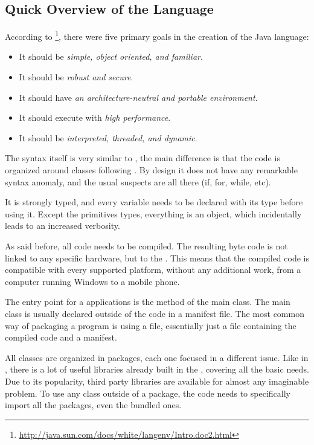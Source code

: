 
\subsection{Quick Overview of the Language} %
\label{sub:overviewjava}

According to \footnote{\url{http://java.sun.com/docs/white/langenv/Intro.doc2.html}}, there were five primary goals in the creation of the Java language:

\begin{itemize}
  \item It should be \emph{simple, object oriented, and familiar}.
  \item It should be \emph{robust and secure}.
  \item It should have \emph{an architecture-neutral and portable environment}.
  \item It should execute with \emph{high performance}.
  \item It should be \emph{interpreted, threaded, and dynamic}.
\end{itemize}

The syntax itself is very similar to , the main difference is that the code is organized around classes following .
By design it does not have any remarkable syntax anomaly, and the usual suspects are all there (if, for, while, etc).

It is strongly typed, and every variable needs to be declared with its type before using it.
Except the primitives types, everything is an object, which incidentally leads to an increased verbosity.

As said before, all code needs to be compiled.
The resulting byte code is not linked to any specific hardware, but to the .
This means that the compiled code is compatible with every supported platform, without any additional work, from a computer running Windows to a mobile phone.

The entry point for a  applications is the  method of the main class.
The main class is usually declared outside of the  code in a manifest file.
The most common way of packaging a program is using a  file, essentially just a  file containing the compiled code and a manifest.

All classes are organized in packages, each one focused in a different issue.
Like in , there is a lot of useful libraries already built in the , covering all the basic needs.
Due to its popularity, third party libraries are available for almost any imaginable problem.
To use any class outside of a package, the code needs to specifically import all the packages, even the bundled ones.

